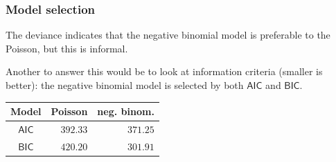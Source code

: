 \documentclass{beamer}
\begin{document}
\begin{frame}[fragile]
\frametitle{Model selection}
\bi
\item The deviance indicates that the negative binomial model is preferable to the Poisson, but this is informal.
\item Another to answer this would be to look at information criteria (smaller is better): the negative binomial model is selected by both $\mathsf{AIC}$ and $\mathsf{BIC}$.
\ei
\begin{center}
\begin{tabular}{crr}
\toprule
 Model & \multicolumn{1}{c}{Poisson} & \multicolumn{1}{c}{neg. binom.}
 \\ \midrule
 $\mathsf{AIC}$ & $392.33$ & $371.25$ \\
$\mathsf{BIC}$ & $420.20$ & $301.91$ \\\bottomrule
\end{tabular}
\end{center}


\end{frame}
\end{document}
